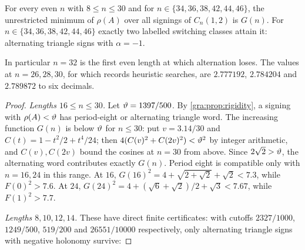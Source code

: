 \begin{theorem}\label{gra:thm:alternating}
For every even $n$ with $8\le n\le30$ and for
$n\in\{34,36,38,42,44,46\}$, the unrestricted minimum of $\rho(A)$ over
all signings of $C_n(1,2)$ is $G(n)$. For
$n\in\{34,36,38,42,44,46\}$ exactly two labelled switching classes attain
it: alternating triangle signs with $\alpha=-1$.
\end{theorem}

In particular $n=32$ is the first even length at which alternation loses.
The values at $n=26,28,30$, for which \cite[Remark~29]{Suvagiya2026Parity}
records heuristic searches, are $2.777192$, $2.784204$ and $2.789872$ to
six decimals.

\begin{proof}
\emph{Lengths $16\le n\le30$.} Let $\vartheta=1397/500$. By
\cref{gra:prop:rigidity}, a signing with $\rho(A)<\vartheta$ has
period-eight or alternating triangle word. The increasing function $G(n)$ is below $\vartheta$ for $n\le30$: put
$v=3.14/30$ and $C(t)=1-t^2/2+t^4/24$; then
$4(C(v)^2+C(2v)^2)<\vartheta^2$ by integer arithmetic, and $C(v),C(2v)$
bound the cosines at $n=30$ from above. Since $2\sqrt2>\vartheta$, the
alternating word contributes exactly $G(n)$. Period eight is compatible
only with $n=16,24$ in this range. At $16$,
$G(16)^2=4+\sqrt{2+\sqrt2}+\sqrt2<7.3$, while $F(0)^2>7.6$. At $24$,
$G(24)^2=4+(\sqrt6+\sqrt2)/2+\sqrt3<7.67$, while $F(1)^2>7.7$.

\emph{Lengths $8,10,12,14$.} These have direct finite certificates: with
cutoffs $2327/1000$, $1249/500$, $519/200$ and $26551/10000$ respectively,
only alternating triangle signs with negative holonomy survive:


\end{proof}
